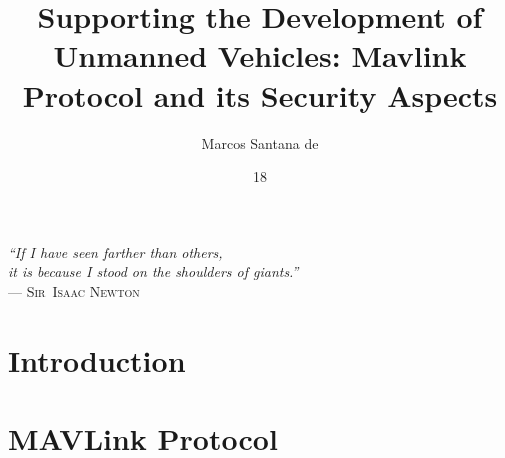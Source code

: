 \documentclass[tg,eng]{ita}    %
\author{Marcos Santana de}{Oliveira}
\title{Supporting the Development of Unmanned Vehicles: Mavlink Protocol and its Security Aspects}
\date{18}{JUNE}{2018}
\begin{document}
\maketitle


%

\thispagestyle{empty}
\ifhyperref{}\fi
\begin{flushright}
\begin{spacing}{1}
\mbox{}\vfill
{\sffamily\itshape
``If I have seen farther than others,\\
it is because I stood on the shoulders of giants.''\\}
--- \textsc{Sir~Isaac Newton}
\end{spacing}
\end{flushright}


\begin{englishabstract}
\noindent

\end{englishabstract}





\tableofcontents

\mainmatter

\chapter{Introduction}


\chapter{MAVLink Protocol}

\end{document}
